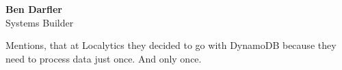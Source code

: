 \vspace{20pt}

\hspace{-20pt}
\begin{minipage}[t]{4cm}
\textbf{Ben Darfler} \\
Systems Builder \\
\end{minipage}
\hfill
\begin{minipage}[t]{10cm}
Mentions, that at Localytics they decided to go with DynamoDB because they need to process data just once. And only once.\cite{user-stories} \\
\end{minipage}














